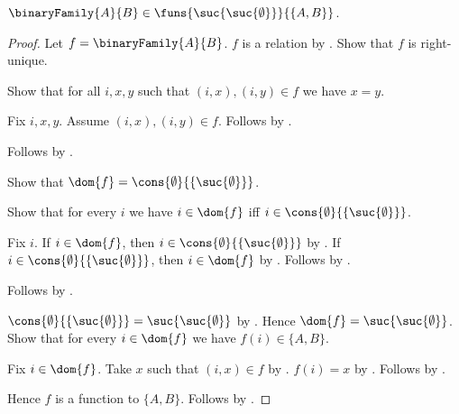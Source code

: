 \begin{proposition}\label{binary_family_type}
    $\binaryFamily{A}{B}\in
        \funs{\suc{\suc{\emptyset}}}{\{A,B\}}$.
\end{proposition}
\begin{proof}
    Let $f=\binaryFamily{A}{B}$.
    $f$ is a relation by
        .
    Show that $f$ is right-unique.
    \begin{subproof}
        Show that for all $i,x,y$ such that $(i,x),(i,y)\in f$
            we have $x=y$.
        \begin{subproof}
            Fix $i,x,y$.
            Assume $(i,x),(i,y)\in f$.
            Follows by
                .
        \end{subproof}
        Follows by .
    \end{subproof}
    Show that $\dom{f}=\cons{\emptyset}{\{\suc{\emptyset}\}}$.
    \begin{subproof}
        Show that for every $i$ we have
            $i\in\dom{f}$ iff
                $i\in\cons{\emptyset}{\{\suc{\emptyset}\}}$.
        \begin{subproof}
            Fix $i$.
            If $i\in\dom{f}$, then
                $i\in\cons{\emptyset}{\{\suc{\emptyset}\}}$ by
                .
            If $i\in\cons{\emptyset}{\{\suc{\emptyset}\}}$, then
                $i\in\dom{f}$ by
                .
            Follows by \auto.
        \end{subproof}
        Follows by .
    \end{subproof}
    $\cons{\emptyset}{\{\suc{\emptyset}\}}
        =\suc{\suc{\emptyset}}$ by
        .
    Hence $\dom{f}=\suc{\suc{\emptyset}}$.
    Show that for every $i\in\dom{f}$ we have $f(i)\in\{A,B\}$.
    \begin{subproof}
        Fix $i\in\dom{f}$.
        Take $x$ such that $(i,x)\in f$ by .
        $f(i)=x$ by .
        Follows by
            .
    \end{subproof}
    Hence $f$ is a function to $\{A,B\}$.
    Follows by .
\end{proof}

